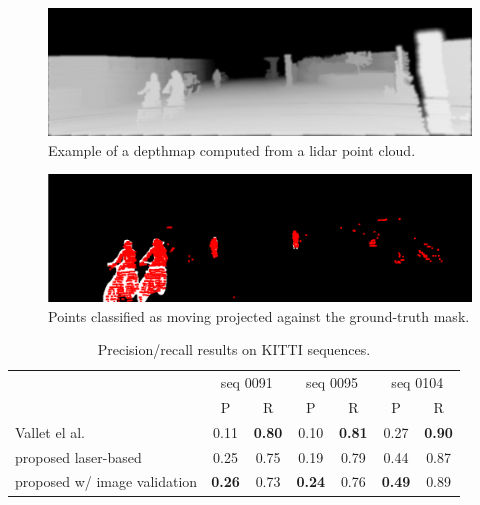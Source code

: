 \begin{figure}[t]
\centering
\includegraphics[width=0.8\columnwidth]{./img/ch-laser/depth-0129}
\caption{Example of a depthmap computed from a lidar point cloud.}
\label{fig:depth}
\end{figure}

\begin{figure}[t]
\centering
\includegraphics[width=0.8\columnwidth]{./img/ch-laser/points_result_on_mask}
\caption{Points classified as moving projected against the ground-truth mask.} 
\label{fig:points}
\end{figure}




\begin{table}[t]
\caption{Precision/recall results on KITTI sequences.}
\label{tab:resPR}
\centering
\setlength{\tabcolsep}{3px}
\begin{tabular}{lcccccc}
\toprule                                                                                
&\multicolumn{2}{c}{seq 0091}&\multicolumn{2}{c}{seq 0095}&\multicolumn{2}{c}{seq 0104}\\
&P & R &P & R &P & R \\
\midrule
Vallet el al.~\cite{vallet2015extracting}       &       0.11&\textbf{0.80}      &       0.10&\textbf{0.81}      & 0.27&\textbf{0.90}\\
proposed laser-based                            &   0.25&0.75   &  0.19&0.79    & 0.44&0.87\\
proposed w/ image validation                            &       \textbf{0.26}&0.73      &  \textbf{0.24}&0.76   & \textbf{0.49}&0.89\\
\end{tabular}
\end{table}


